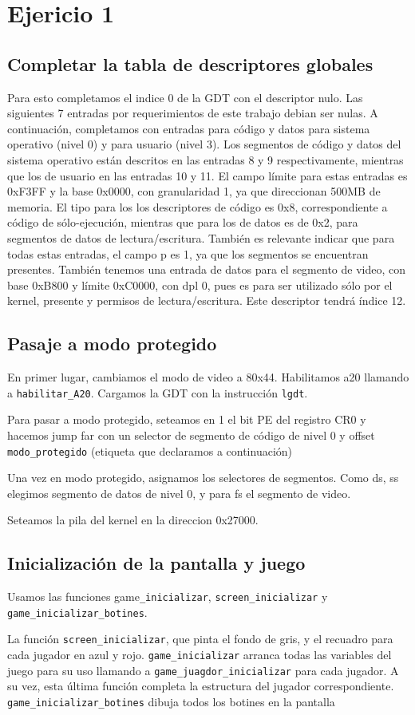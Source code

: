 \section{Ejericio 1}

\subsection{Completar la tabla de descriptores globales}
Para esto completamos el indice 0 de la GDT con el descriptor nulo. Las siguientes 7 entradas por requerimientos de este trabajo debian ser nulas.
A continuación, completamos con entradas para código y datos para sistema operativo (nivel 0) y para usuario (nivel 3). Los segmentos de código y datos del sistema operativo están descritos en las entradas 8 y 9 respectivamente, mientras que los de usuario en las entradas 10 y 11. 
El campo límite para estas entradas es 0xF3FF y la base 0x0000, con granularidad 1, ya que direccionan  500MB de memoria. El tipo para los los descriptores de código es 0x8, correspondiente a código de sólo-ejecución, mientras que para los de datos es de 0x2, para segmentos de datos de lectura/escritura. También es relevante indicar que para todas estas entradas, el campo p es 1, ya que los segmentos se encuentran presentes.
También tenemos una entrada de datos para el segmento de video, con base 0xB800 y límite 0xC0000, con dpl 0, pues es para ser utilizado sólo por el kernel, presente y permisos de lectura/escritura. Este descriptor tendrá índice 12. 

\subsection{Pasaje a modo protegido}
En primer lugar, cambiamos el modo de video a 80x44.
Habilitamos a20 llamando a \texttt{habilitar\_A20}.
Cargamos la GDT  con la instrucción \texttt{lgdt}.

Para pasar a modo protegido, seteamos en 1 el bit PE del registro CR0 y hacemos jump far con un selector de segmento de código de nivel 0 y offset \texttt{modo\_protegido} (etiqueta que declaramos a continuación)

Una vez en modo protegido, asignamos los selectores de segmentos. Como ds, ss elegimos segmento de datos de nivel 0, y para fs el segmento de video.

Seteamos la pila del kernel en la direccion 0x27000.

\subsection{Inicialización de la pantalla y juego}

Usamos las funciones game\texttt{\_inicializar}, \texttt{screen\_inicializar} y \texttt{game\_inicializar\_botines}.

La función \texttt{screen\_inicializar}, que pinta el fondo de gris, y el recuadro para cada jugador en azul y rojo.
\texttt{game\_inicializar} arranca todas las variables del juego para su uso llamando a \texttt{game\_juagdor\_inicializar} para cada jugador. A su vez, esta última función completa la estructura del jugador correspondiente.
\texttt{game\_inicializar\_botines} dibuja todos los botines en la pantalla
